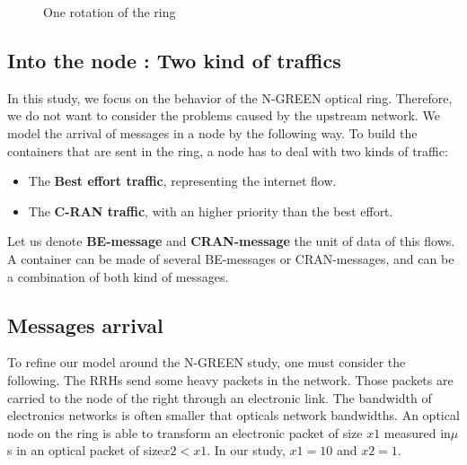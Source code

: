 \documentclass[a4paper,10pt,french,english]{article}
\begin{document}
\begin{figure}[h!]
      \caption{One rotation of the ring}
  \end{figure}

\subsection{Into the node : Two kind of traffics}
  In this study, we focus on the behavior of the N-GREEN optical ring. Therefore, we do not want to consider the problems caused by the upstream network. We model the arrival of messages in a node by the following way.
    To build the containers that are sent in the ring, a node has to deal with two kinds of traffic: 
    \begin{itemize}
    \item The {\bf Best effort traffic}, representing the internet flow.
    \item The {\bf C-RAN traffic}, with an higher priority than the best effort.
    \end{itemize}
    Let us denote {\bf BE-message} and {\bf CRAN-message} the unit of data of this flows. A container can be made of several BE-messages or CRAN-messages, and can be a combination of both kind of messages.

  \subsection{Messages arrival}
   To refine our model around the N-GREEN study, one must consider the following. The RRHs send some heavy packets in the network. Those packets are carried to the node of the right through an electronic link. The bandwidth of electronics networks is often smaller that opticals network bandwidths. An optical node on the ring is able to transform an electronic packet of size $x1$ measured in$\mu$s in an optical packet of size$x2 < x1$. In our study, $x1 = 10$ and $x2 = 1$. 
    
\end{document}
